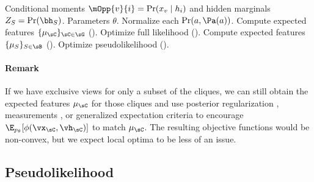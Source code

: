 \begin{algorithm}
  \caption{\LearnParameters}
  \label{algo:undirected}
  \begin{algorithmic}
    \REQUIRE Conditional moments $\mOpp{v}{i} = \Pr(x_v \mid h_i)$
             and hidden marginals $Z_S = \Pr(\bh_S)$.
    \ENSURE Parameters $\theta$.
     \STATE Normalize each $\Pr(a,\Pa(a))$. \ENDIF
      \STATE Compute expected features $\{\mu_\sC\}_{\sC \in \sG}$ ().
      \STATE Optimize full likelihood ().
    \ENDIF
      \STATE Compute expected features $\{\mu_S\}_{S \in \sB}$ ().
      \STATE Optimize pseudolikelihood ().
    \ENDIF
    \end{algorithmic}
\end{algorithm}

\paragraph{Remark} If we have exclusive views for only a subset of the cliques,
we can still obtain the expected features $\mu_\sC$ for those cliques
  and use posterior regularization \citep{graca08em}, measurements \citep{liang09measurements}, or generalized
  expectation criteria \citep{mann08ge}
  to encourage $\E_{p_\theta}[\phi(\vx_\sC,\vh_\sC)]$ to match $\mu_\sC$.
The resulting objective functions would be non-convex, but we expect
  local optima to be less of an issue.

\subsection{Pseudolikelihood}
\label{sec:pseudolikelihood}


